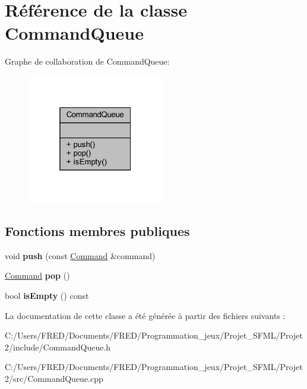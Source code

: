 \hypertarget{class_command_queue}{}\section{Référence de la classe Command\+Queue}
\label{class_command_queue}


Graphe de collaboration de Command\+Queue\+:\nopagebreak
\begin{figure}[H]
\begin{center}
\leavevmode
\includegraphics[width=169pt]{class_command_queue__coll__graph}
\end{center}
\end{figure}
\subsection*{Fonctions membres publiques}
\begin{DoxyCompactItemize}
\item 
void {\bfseries push} (const \hyperlink{struct_command}{Command} \&command)\hypertarget{class_command_queue_ad444e0d7af45d9e09b834f0cec1e1f43}{}\label{class_command_queue_ad444e0d7af45d9e09b834f0cec1e1f43}

\item 
\hyperlink{struct_command}{Command} {\bfseries pop} ()\hypertarget{class_command_queue_ac2dde510222b8df393b55978f4594194}{}\label{class_command_queue_ac2dde510222b8df393b55978f4594194}

\item 
bool {\bfseries is\+Empty} () const \hypertarget{class_command_queue_ad4f4731c185a293724a59aba9a5903d6}{}\label{class_command_queue_ad4f4731c185a293724a59aba9a5903d6}

\end{DoxyCompactItemize}


La documentation de cette classe a été générée à partir des fichiers suivants \+:\begin{DoxyCompactItemize}
\item 
C\+:/\+Users/\+F\+R\+E\+D/\+Documents/\+F\+R\+E\+D/\+Programmation\+\_\+jeux/\+Projet\+\_\+\+S\+F\+M\+L/\+Projet2/include/Command\+Queue.\+h\item 
C\+:/\+Users/\+F\+R\+E\+D/\+Documents/\+F\+R\+E\+D/\+Programmation\+\_\+jeux/\+Projet\+\_\+\+S\+F\+M\+L/\+Projet2/src/Command\+Queue.\+cpp\end{DoxyCompactItemize}
